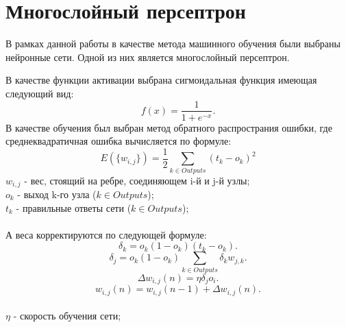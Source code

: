 \newpage

\section {Многослойный персептрон}
В рамках данной работы в качестве метода машинного обучения были выбраны нейронные сети. Одной из них является многослойный персептрон.
\begin{figure}[H]
\end{figure}
В качестве функции активации выбрана сигмоидальная функция имеющая следующий вид:
$$ f(x)=\frac{1}{1+e^{-x}}.$$
В качестве  обучения был выбран метод обратного распространия ошибки, где  среднеквадратичная ошибка вычисляется по формуле:
$$ E(\{w_{i,j}\})=\frac{1}{2}\sum_{k \in Outputs}(t_k-o_k)^2$$ \small
\normalsize $ w_{i,j} $ \small - вес, стоящий на ребре, соединяющем i-й и j-й узлы;\\
\normalsize $ o_k $ \small - выход k-го узла ($k \in Outputs$);\\
\normalsize $ t_k $ \small - правильные ответы сети ($k \in Outputs$);
\normalsize
\\
\\
А веса корректируются по следующей формуле:
$$ \delta_k=o_k(1-o_k)(t_k-o_k).$$
$$ \delta_j=o_k(1-o_k)\sum_{k \in Outputs} \delta_k w_{j,k}.$$
$$ \Delta w_{i,j}(n)=\eta\delta_jo_i.$$ 
$$ w_{i,j}(n)=w_{i,j}(n-1)+\Delta w_{i,j}(n).$$ 
\\
$ \eta $ \small - скорость обучения сети;
\normalsize

